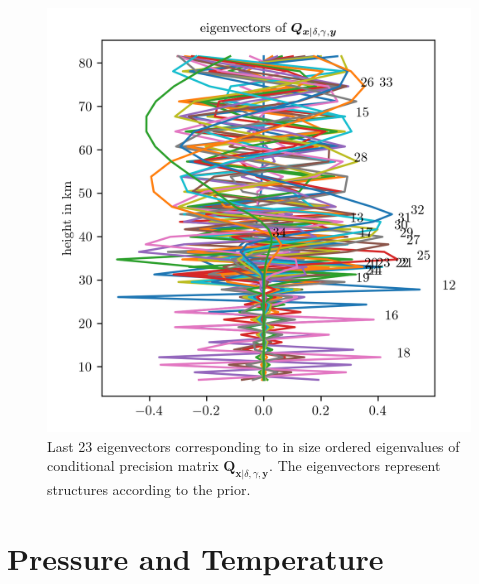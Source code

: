  \begin{figure}[ht!]
 	\centering
 	\includegraphics{CovEigVec2.png}
 	\caption[Last 23 eigenvectors of conditional precision matrix.]{Last 23 eigenvectors corresponding to in size ordered eigenvalues of conditional precision matrix $\bm{Q}_{ \bm{x}|\delta, \gamma, \bm{y}}$. The eigenvectors represent structures according to the prior.}
 	\label{fig:CovEigVec2}
 \end{figure}
\clearpage
\section{Pressure and Temperature}

